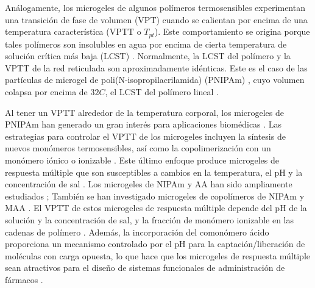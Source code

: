 An\'alogamente, los microgeles de algunos pol\'imeros termosensibles experimentan una transici\'on de fase de volumen (VPT) cuando se calientan por encima de una temperatura caracter\'istica (VPTT o $T_{pt}$).
Este comportamiento se origina porque tales pol\'imeros son insolubles en agua por encima de cierta temperatura de soluci\'on cr\'itica m\'as baja (LCST) \addcite[Kawaguch2020].
Normalmente, la LCST del pol\'imero y la VPTT de la red reticulada son aproximadamente id\'enticas. 
Este es el caso de las part\'iculas de microgel de poli(N-isopropilacrilamida) (PNIPAm) \addcite[Pelton1986], cuyo volumen colapsa por encima de $32 C$, el LCST del pol\'imero lineal \addcite[Schild1992].

Al tener un VPTT alrededor de la temperatura corporal, los microgeles de PNIPAm han generado un gran inter\'es para aplicaciones biom\'edicas \addcite[Guan2011].
Las estrategias para controlar el VPTT de los microgeles incluyen la s\'intesis de nuevos mon\'omeros termosensibles, as\'i como la copolimerizaci\'on con un mon\'omero i\'onico o ionizable .
Este \'ultimo enfoque produce microgeles de respuesta m\'ultiple que son susceptibles a cambios en la temperatura, el pH y la concentraci\'on de sal .
Los microgeles de NIPAm y AA han sido ampliamente estudiados ;
Tambi\'en se han investigado microgeles de copol\'imeros de NIPAm y MAA .
El VPTT de estos microgeles de respuesta m\'ultiple depende del pH de la soluci\'on y la concentraci\'on de sal, y la fracci\'on de mon\'omero ionizable en las cadenas de pol\'imero .
Adem\'as, la incorporaci\'on del comon\'omero \'acido proporciona un mecanismo controlado por el pH para la captaci\'on/liberaci\'on de mol\'eculas con carga opuesta, lo que hace que los microgeles de respuesta m\'ultiple sean atractivos para el dise\~no de sistemas funcionales de administraci\'on de f\'armacos \addcite[Liu2017].

